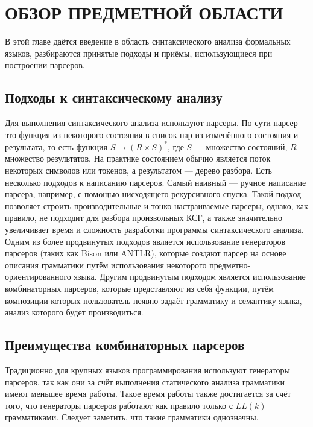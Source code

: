 \documentclass[times]{itmo-student-thesis}
\begin{document}
\chapter{ОБЗОР ПРЕДМЕТНОЙ ОБЛАСТИ}

В этой главе даётся введение в область синтаксического анализа формальных языков, разбираются принятые подходы и приёмы, 
использующиеся при построении парсеров.

\section{Подходы к синтаксическому анализу}\label{sec:parsing_approaches}

Для выполнения синтаксического анализа используют парсеры. По сути парсер это функция из некоторого состояния в
список пар из изменённого состояния и результата, то есть функция $S \rightarrow (R \times S)^*$, где $S$
--- множество состояний, $R$ --- множество результатов. На практике состоянием обычно является поток
некоторых символов или токенов, а результатом --- дерево разбора. Есть несколько подходов к написанию парсеров. Самый
наивный --- ручное написание парсера, например, с помощью нисходящего рекурсивного спуска. Такой подход позволяет
строить производительные и тонко настраиваемые парсеры, однако, как правило, не подходит для разбора произвольных КСГ,
а также значительно увеличивает время и сложность разработки программы синтаксического анализа. Одним из более
продвинутых подходов является использование генераторов парсеров (таких как Bison\cite{bison} или
ANTLR\cite{antlr}), которые создают парсер на основе описания грамматики путём использования некоторого
предметно-ориентированного языка. Другим продвинутым подходом является использование комбинаторных парсеров, которые
представляют из себя функции, путём композиции которых пользователь неявно задаёт грамматику и семантику языка, анализ
которого будет производиться.

\section{Преимущества комбинаторных парсеров}\label{sec:parser_combinators_advantages}

Традиционно для крупных языков программирования используют генераторы парсеров, так как они за счёт выполнения
статического анализа грамматики имеют меньшее время работы. Такое время работы также достигается за счёт того, что
генераторы парсеров работают как правило только с $LL(k)$ грамматиками. Следует заметить, что такие
грамматики однозначны.
\end{document}

